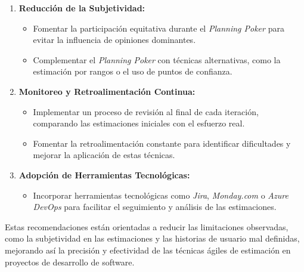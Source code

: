\begin{enumerate}
    \item \textbf{Reducción de la Subjetividad:}
    \begin{itemize}
        \item Fomentar la participación equitativa durante el \textit{Planning Poker} para evitar la influencia de opiniones dominantes.
        \item Complementar el \textit{Planning Poker} con técnicas alternativas, como la estimación por rangos o el uso de puntos de confianza.
    \end{itemize}

    \item \textbf{Monitoreo y Retroalimentación Continua:}
    \begin{itemize}
        \item Implementar un proceso de revisión al final de cada iteración, comparando las estimaciones iniciales con el esfuerzo real.
        \item Fomentar la retroalimentación constante para identificar dificultades y mejorar la aplicación de estas técnicas.
    \end{itemize}

    \item \textbf{Adopción de Herramientas Tecnológicas:}
    \begin{itemize}
        \item Incorporar herramientas tecnológicas como \textit{Jira}, \textit{Monday.com} o \textit{Azure DevOps} para facilitar el seguimiento y análisis de las estimaciones.
    \end{itemize}
\end{enumerate}

Estas recomendaciones están orientadas a reducir las limitaciones observadas, como la subjetividad en las estimaciones y las historias de usuario mal definidas, mejorando así la precisión y efectividad de las técnicas ágiles de estimación en proyectos de desarrollo de software.
